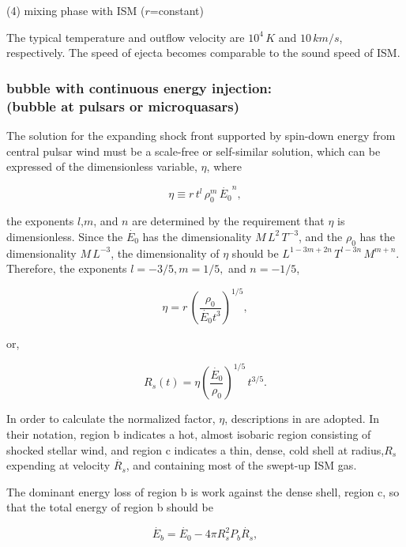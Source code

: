 \noi (4) mixing phase with ISM ($r$=constant)

The typical temperature and outflow velocity are $10^{4}\, K$ and $10\, km/s$, respectively. 
The speed of ejecta becomes comparable to the sound speed of ISM.


\subsubsection{bubble with continuous energy injection:\\ (bubble at pulsars or microquasars)}

The solution for the expanding shock front supported by spin-down energy from central pulsar
wind must be a scale-free or self-similar solution, which can be expressed of the dimensionless
variable, $\eta$, where

\begin{equation}
   \eta \equiv r\,t^{l}\,\rho_{0}^{m}\,\dot{E_{0}}^{n},
\end{equation}

\noi the exponents $l$,$m$, and $n$ are determined by the requirement that $\eta$ is
dimensionless.  Since the $\dot{E_{0}}$ has the dimensionality $M\,L^{2}\,T^{-3}$, and the
$\rho_{0}$ has the dimensionality $M\,L^{-3}$, the dimensionality of $\eta$ should be
$L^{1-3m+2n}\,T^{l-3n}\,M^{m+n}$. Therefore, the exponents $l=-3/5, m=1/5,$ and $n=-1/5$,

\begin{equation}
   \eta = r \, \left( \frac{\rho_{0}}{\dot{E_{0}}t^{3}} \right)^{1/5},
\end{equation}

\noi or,

\begin{equation}\label{eq:Rs}
   R_{s}(t) = \eta \left( \frac{\dot{E_{0}}}{\rho_{0}} \right)^{1/5}\,t^{3/5}.
\end{equation}

In order to calculate the normalized factor, $\eta$, descriptions in \cite{Castor:75}
are adopted. In their notation, region b indicates a hot, almost isobaric region consisting 
of shocked stellar wind, and region c indicates a thin, dense, cold shell at radius,$R_{s}$
expending at velocity $\dot{R_{s}}$, and containing most of the swept-up ISM gas.

The dominant energy loss of region b is work against the dense shell, region c, so that the
total energy of region b should be

\begin{equation}\label{eq:Castor1}
   \dot{E_{b}} = \dot{E_{0}} - 4 \pi R_{s}^2 P_{b} \dot{R_{s}},
\end{equation}

